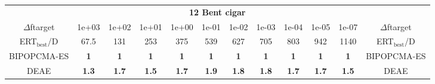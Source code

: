 \begin{tabular}{cccccccccccc}
 & \multicolumn{10}{c}{{\normalsize \textbf{12 Bent cigar}}}\\
$\Delta$ftarget& 1e+03& 1e+02& 1e+01& 1e+00& 1e-01& 1e-02& 1e-03& 1e-04& 1e-05& 1e-07 & $\Delta$ftarget \\
ERT$_{\textrm{best}}$/D& 67.5& 131& 253& 375& 539& 627& 705& 803& 942& 1140 & ERT$_{\textrm{best}}$/D \\
\hline
BIPOPCMA-ES & \textbf{1} & \textbf{1} & \textbf{1} & \textbf{1} & \textbf{1} & \textbf{1} & \textbf{1} & \textbf{1} & \textbf{1} & \textbf{1} & BIPOPCMA-ES \cite{add_an_entry_for_BIPOPCMA-ES_in_bbob.bib}\\
DEAE & \textbf{1.3} & \textbf{1.7} & \textbf{1.5} & \textbf{1.7} & \textbf{1.9} & \textbf{1.8} & \textbf{1.8} & \textbf{1.7} & \textbf{1.7} & \textbf{1.5} & DEAE \cite{add_an_entry_for_DEAE_in_bbob.bib}
\end{tabular}
